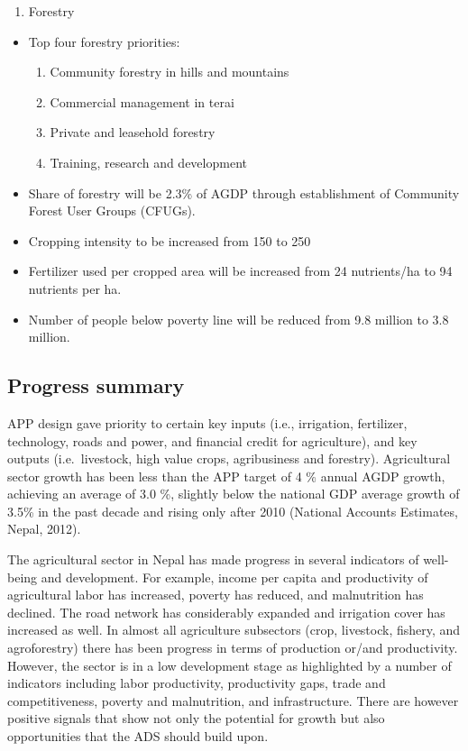 \documentclass[
  openany]{book}
\providecommand{\tightlist}{%
  \setlength{\itemsep}{0pt}\setlength{\parskip}{0pt}}
\begin{document}
\begin{enumerate}
\def\labelenumi{\arabic{enumi}.}
\setcounter{enumi}{3}
\tightlist
\item
  Forestry
\end{enumerate}

\begin{itemize}
\item
  Top four forestry priorities:

  \begin{enumerate}
  \def\labelenumi{\roman{enumi}.}
  \tightlist
  \item
    Community forestry in hills and mountains
  \item
    Commercial management in terai
  \item
    Private and leasehold forestry
  \item
    Training, research and development
  \end{enumerate}
\item
  Share of forestry will be 2.3\% of AGDP through establishment of Community Forest User Groups (CFUGs).
\item
  Cropping intensity to be increased from 150 to 250
\item
  Fertilizer used per cropped area will be increased from 24 nutrients/ha to 94 nutrients per ha.
\item
  Number of people below poverty line will be reduced from 9.8 million to 3.8 million.
\end{itemize}

\hypertarget{progress-summary}{%
\subsection{Progress summary}\label{progress-summary}}

APP design gave priority to certain key inputs (i.e., irrigation, fertilizer, technology, roads and power, and financial credit for agriculture), and key outputs (i.e.~livestock, high value crops, agribusiness and forestry). Agricultural sector growth has been less than the APP target of 4 \% annual AGDP growth, achieving an average of 3.0 \%, slightly below the national GDP average growth of 3.5\% in the past decade and rising only after 2010 (National Accounts Estimates, Nepal, 2012).

The agricultural sector in Nepal has made progress in several indicators of well-being and development. For example, income per capita and productivity of agricultural labor has increased, poverty has reduced, and malnutrition has declined. The road network has considerably expanded and irrigation cover has increased as well. In almost all agriculture subsectors (crop, livestock, fishery, and agroforestry) there has been progress in terms of production or/and productivity. However, the sector is in a low development stage as highlighted by a number of indicators including labor productivity, productivity gaps, trade and competitiveness, poverty and malnutrition, and infrastructure. There are however positive signals that show not only the potential for growth but also opportunities that the ADS should build upon.
\end{document}
